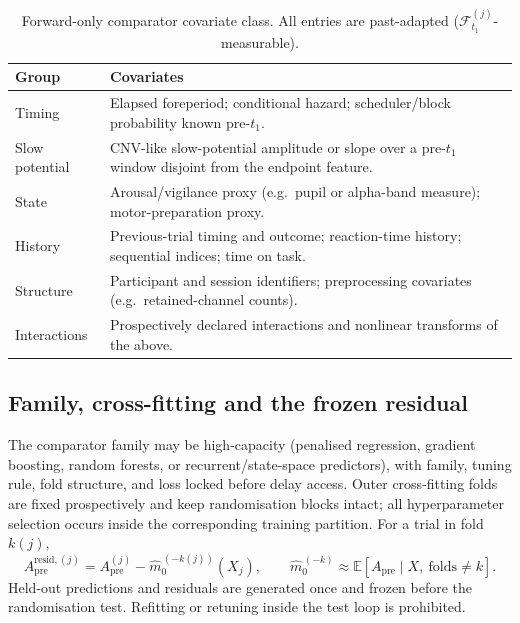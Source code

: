 \documentclass[11pt,a4paper]{article}
\theoremstyle{definition}
\newcommand{\F}{\mathcal{F}}
\newcommand{\Apre}{A_{\mathrm{pre}}}
\begin{document}
\begin{table}[t]
\centering
\caption{Forward-only comparator covariate class. All entries are past-adapted
(\(\F_{t_1}^{(j)}\)-measurable).}
\label{tab:si-comparator}
\footnotesize
\begin{tabularx}{\textwidth}{@{}p{3.6cm}X@{}}
\toprule
\textbf{Group} & \textbf{Covariates} \\
\midrule
Timing & Elapsed foreperiod; conditional hazard; scheduler/block probability
known pre-\(t_1\). \\
Slow potential & CNV-like slow-potential amplitude or slope over a pre-\(t_1\)
window disjoint from the endpoint feature. \\
State & Arousal/vigilance proxy (e.g.\ pupil or alpha-band measure);
motor-preparation proxy. \\
History & Previous-trial timing and outcome; reaction-time history; sequential
indices; time on task. \\
Structure & Participant and session identifiers; preprocessing covariates
(e.g.\ retained-channel counts). \\
Interactions & Prospectively declared interactions and nonlinear transforms of
the above. \\
\bottomrule
\end{tabularx}
\end{table}

\subsection{Family, cross-fitting and the frozen residual}
\label{sec:si-crossfit}

The comparator family may be high-capacity (penalised regression, gradient
boosting, random forests, or recurrent/state-space predictors), with family,
tuning rule, fold structure, and loss locked before delay access. Outer
cross-fitting folds are fixed prospectively and keep randomisation blocks intact;
all hyperparameter selection occurs inside the corresponding training partition.
For a trial in fold \(k(j)\),
\begin{equation}
\label{eq:si-residual}
\Apre^{\mathrm{resid},(j)}
=\Apre^{(j)}-\widehat{m}_0^{\,(-k(j))}(X_j),
\qquad
\widehat{m}_0^{\,(-k)}\approx\mathbb{E}[\Apre\mid X,\ \text{folds}\ne k].
\end{equation}
Held-out predictions and residuals are generated once and frozen before the
randomisation test. Refitting or retuning inside the test loop is prohibited.
\end{document}
